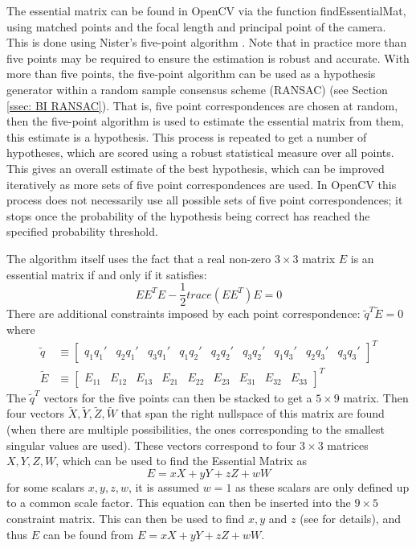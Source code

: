 \documentclass[12pt,a4paper]{article}
\begin{document}
    The essential matrix can be found in OpenCV via the function findEssentialMat, using matched points and the focal length and principal point of the camera. This is done using Nister's five-point algorithm \cite{nister2003efficient}. Note that in practice more than five points may be required to ensure the estimation is robust and accurate. With more than five points, the five-point algorithm can be used as a hypothesis generator within a random sample consensus scheme (RANSAC) (see Section \ref{ssec: BI RANSAC}). That is, five point correspondences are chosen at random, then the five-point algorithm is used to estimate the essential matrix from them, this estimate is a hypothesis. This process is repeated to get a number of hypotheses, which are scored using a robust statistical measure over all points. This gives an overall estimate of the best hypothesis, which can be improved iteratively as more sets of five point correspondences are used. In OpenCV this process does not necessarily use all possible sets of five point correspondences; it stops once the probability of the hypothesis being correct has reached the specified probability threshold.
     
    The algorithm itself uses the fact that a real non-zero $3\times 3$ matrix $E$ is an essential matrix if and only if it satisfies:
    \[
    EE^TE - \frac{1}{2}trace(EE^T)E = 0
    \]
    There are additional constraints imposed by each point correspondence: $\tilde{q}^T \tilde{E} = 0$ where
    \begin{align*}
    \tilde{q} &\equiv \begin{bmatrix} q_1q_1' & q_2q_1' & q_3q_1' & q_1q_2' & q_2q_2' & q_3q_2' & q_1q_3' & q_2q_3' & q_3q_3' \end{bmatrix}^T \\
    \tilde{E} &\equiv \begin{bmatrix} E_{11} & E_{12} & E_{13} & E_{21} & E_{22} & E_{23} & E_{31} & E_{32} & E_{33} \end{bmatrix}^T 
    \end{align*}
    The $\tilde{q}^T$ vectors for the five points can then be stacked to get a $5 \times 9$ matrix. Then four vectors $\tilde{X}, \tilde{Y}, \tilde{Z}, \tilde{W}$ that span the right nullspace of this matrix are found (when there are multiple possibilities, the ones corresponding to the smallest singular values are used). These vectors correspond to four $3\times 3$ matrices $X, Y, Z, W$, which can be used to find the Essential Matrix as 
    \[
    E = xX + yY + zZ + wW
    \]
    for some scalars $x,y,z,w$, it is assumed $w=1$ as these scalars are only defined up to a common scale factor. This equation can then be inserted into the $9 \times 5$ constraint matrix. This can then be used to find $x,y$ and $z$ (see \cite{nister2003efficient} for details), and thus $E$ can be found from $E = xX + yY + zZ + wW$.
     
\end{document}
